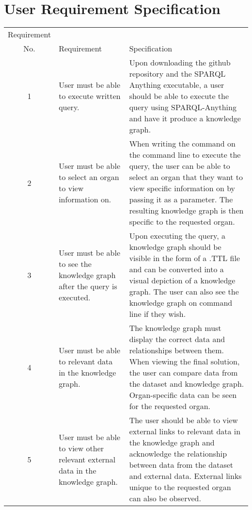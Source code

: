 \begin{table}[h!]
\section{User Requirement Specification}
\begin{center}
\begin{tabular}{c|p{2in}p{2.55in}}
Requirement \\ No.&Requirement&Specification\\\hline 

1&
User must be able to execute written query. & 
Upon downloading the github repository and the SPARQL Anything executable, a user should be able to execute the query using SPARQL-Anything and have it produce a knowledge graph. \\
\hline

2& 
User must be able to select an organ to view information on. &
When writing the command on the command line to execute the query, the user can be able to select an organ that they want to view specific information on by passing it as a parameter. The resulting knowledge graph is then specific to the requested organ. \\
\hline

3&
User must be able to see the knowledge graph after the query is executed. &
Upon executing the query, a knowledge graph should be visible in the form of a .TTL file and can be converted into a visual depiction of a knowledge graph. The user can also see the knowledge graph on command line if they wish.\\
\hline

4&
User must be able to relevant data in the knowledge graph. & 
The knowledge graph must display the correct data and relationships between them. When viewing the final solution, the user can compare data from the dataset and knowledge graph. Organ-specific data can be seen for the requested organ.\\
\hline

5&
User must be able to view other relevant external data in the knowledge graph. & 
The user should be able to view external links to relevant data in the knowledge graph and acknowledge the relationship between data from the dataset and external data. External links unique to the requested organ can also be observed. 

\end{tabular}
\end{center}
\end{table}

